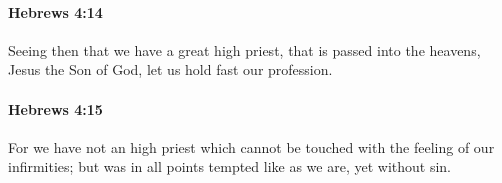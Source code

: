 		\paragraph{Hebrews 4:14} %
			\label{HEBREWS-4-14}

			Seeing then that we have a great high priest, that is passed into the heavens, Jesus the Son of God, let us hold fast our profession.

			\begin{framed}
			\scriptsize
				\begin{compactdesc}
					\item[SBLG] 
				\end{compactdesc}
			\end{framed}

		\paragraph{Hebrews 4:15} %
			\label{HEBREWS-4-15}

			For we have not an high priest which cannot be touched with the feeling of our infirmities; but was in all points tempted like as we are, yet without sin.

